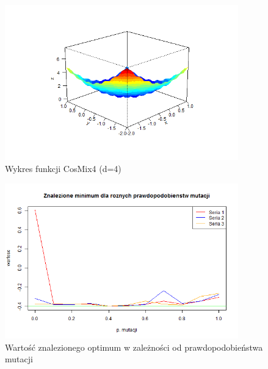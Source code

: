 \documentclass[11pt, a4paper]{article}
\begin{document}
\begin{figure}[H]
	\begin{center}
		\includegraphics[width=0.9\textwidth]{./assets/CosMix41.png} %
		\caption{Wykres funkcji CosMix4 (d=4)}
		\label{fig:cosmix41}
	\end{center}
\end{figure}

\begin{figure}[H]
	\begin{center}
		\includegraphics[width=0.9\textwidth]{./assets/CosMix42.png} %
		\caption{Wartość znalezionego optimum w zależności od prawdopodobieństwa mutacji}
		\label{fig:cosmix42}
	\end{center}
\end{figure}
\end{document}
